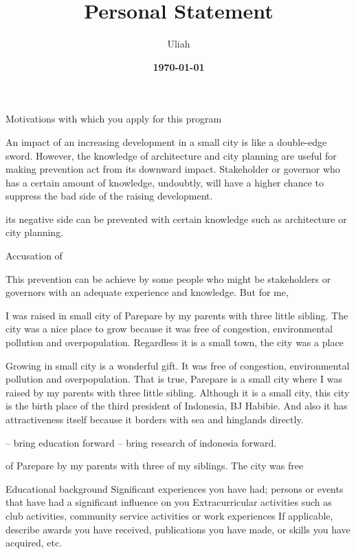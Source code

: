 \documentclass[11pt]{simart} %
\title{
\textbf{Personal Statement} \\
} %
\date{\textbf{\today}}
\author{Uliah}
\begin{document}
\maketitle %

 Motivations with which you apply for this program

An impact of an increasing development in a small city is like a double-edge sword. However,
the knowledge of architecture and city planning are useful for making prevention act from its downward impact. Stakeholder or governor who has a certain amount of knowledge, undoubtly, will have a higher chance to suppress the bad side of the raising development.

its negative side can be prevented with certain knowledge such as architecture or city planning.

Accusation of

This prevention can be achieve by some people who might be stakeholders or governors with an adequate experience and knowledge. But for me,


I was raised in small city of Parepare by my parents with three little sibling. The city was a nice place to grow because it was free of congestion, environmental pollution and overpopulation. Regardless it is a small town, the city was a place


Growing in small city is a wonderful gift. It was free of congestion, environmental pollution and overpopulation. That is true, Parepare is a small city where I was raised by my parents with three little sibling. Although it is a small city, this city is the birth place of the third president of Indonesia, BJ Habibie. And also it has attractiveness itself because it borders with sea and hinglands directly.

-- bring education forward
-- bring research of indonesia forward.

of Parepare by my parents with three of my siblings.
The city was free

 Educational background
 Significant experiences you have had; persons or events that have had a significant influence on you
 Extracurricular activities such as club activities, community service activities or work experiences
 If applicable, describe awards you have received, publications you have made, or skills you have acquired, etc.
\end{document}

